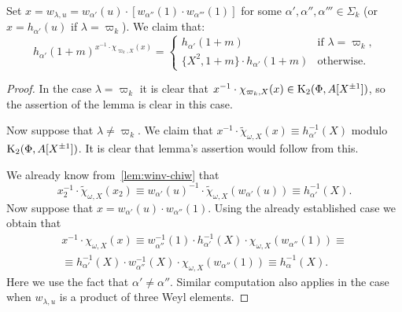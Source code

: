 \begin{lemma} \label{h-computation} Set $ x = w_{\lambda, u} = w_{\alpha'}(u) \cdot [w_{\alpha''}(1) \cdot w_{\alpha'''}(1)]$ for some $\alpha', \alpha'', \alpha''' \in \Sigma_k$ (or $x = h_{\alpha'}(u)$ if $\lambda = \varpi_k$). We claim that:
 \begin{equation*} h_{\alpha'}(1+m)^{x^{-1} \cdot \chi_{\varpi_k, X}(x)} = \left\{\begin{array}{ll} h_{\alpha'}(1+m) & \text{if $\lambda = \varpi_k$,}\\ \{X^2, 1+m\} \cdot h_{\alpha'}(1+m) & \text{otherwise.}\end{array}\right. \end{equation*}
\end{lemma}
\begin{proof}
In the case $\lambda = \varpi_k$ it is clear that $x^{-1} \cdot \chi_{\varpi_k, X}(x) \in \operatorname{K}_2(\Phi, A[X^{\pm 1}])$, so the assertion of the lemma is clear in this case.


Now suppose that $\lambda \neq \varpi_k$. We claim that $x^{-1} \cdot \widetilde{\chi}_{\omega, X}(x) \equiv h_{\alpha'}^{-1}(X)$ modulo $\operatorname{K}_2(\Phi, A[X^{\pm 1}])$. It is clear that lemma's assertion would follow from this.


We already know from~\cref{lem:winv-chiw} that
\[x_2^{-1} \cdot \widetilde{\chi}_{\omega, X}(x_2) \equiv w_{\alpha'}(u)^{-1} \cdot \widetilde{\chi}_{\omega, X}(w_{\alpha'}(u)) \equiv h_{\alpha'}^{-1}(X). \]
Now suppose that $x = w_{\alpha'}(u)\cdot w_{\alpha''}(1)$. Using the already established case we obtain that
\begin{multline*} x^{-1} \cdot \chi_{\omega, X}(x) \equiv w_{\alpha''}^{-1}(1) \cdot h_{\alpha'}^{-1}(X) \cdot \chi_{\omega, X}(w_{\alpha''}(1)) \equiv \\
\equiv h_{\alpha'}^{-1}(X) \cdot w_{\alpha''}^{-1}(X) \cdot \chi_{\omega, X}(w_{\alpha''}(1)) \equiv h_\alpha^{-1}(X). \end{multline*}
Here we use the fact that $\alpha' \neq \alpha''$.
Similar computation also applies in the case when $w_{\lambda, u}$ is a product of three Weyl elements.
\end{proof}


